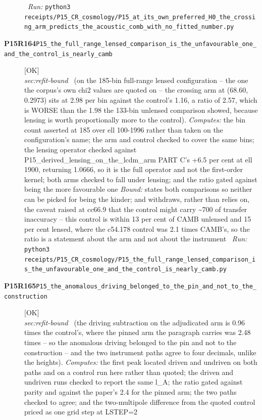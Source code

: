 \begin{description}
\ \emph{Run:} \texttt{python3 receipts/P15\_CR\_cosmology/P15\_at\_its\_own\_preferred\_H0\_the\_crossing\_arm\_predicts\_the\_acoustic\_comb\_with\_no\_fitted\_number.py}
\item[\rcptlabel{P15_the_full_range_lensed_comparison_is_the_unfavourable_one_and_the_control_is_nearly_camb}{P15R164}\textbf{P15R164}\quad\texttt{P15\_the\_full\_range\_lensed\_comparison\_is\_the\_unfavourable\_one\_and\_the\_control\_is\_nearly\_camb}]\hfill\textsf{[OK]}\\
\textit{sec:refit-bound} \ (on the 185-bin full-range lensed configuration -- the one the corpus's own chi2 values are quoted on -- the crossing arm at (68.60, 0.2973) sits at 2.98 per bin against the control's 1.16, a ratio of 2.57, which is WORSE than the 1.98 the 133-bin unlensed comparison showed, because lensing is worth proportionally more to the control). 
\emph{Computes:} the bin count asserted at 185 over ell 100-1996 rather than taken on the configuration's name; the arm and control checked to cover the same bins; the lensing operator checked against P15\_derived\_lensing\_on\_the\_lcdm\_arm PART C's +6.5 per cent at ell 1900, returning 1.0666, so it is the full operator and not the first-order kernel; both arms checked to fall under lensing; and the ratio gated against being the more favourable one
 \emph{Bound:} states both comparisons so neither can be picked for being the kinder; and withdraws, rather than relies on, the caveat raised at cc66.9 that the control might carry \textasciitilde{}700 of transfer inaccuracy -- this control is within 13 per cent of CAMB unlensed and 15 per cent lensed, where the c54.178 control was 2.1 times CAMB's, so the ratio is a statement about the arm and not about the instrument
\ \emph{Run:} \texttt{python3 receipts/P15\_CR\_cosmology/P15\_the\_full\_range\_lensed\_comparison\_is\_the\_unfavourable\_one\_and\_the\_control\_is\_nearly\_camb.py}
\item[\rcptlabel{P15_the_anomalous_driving_belonged_to_the_pin_and_not_to_the_construction}{P15R165}\textbf{P15R165}\quad\texttt{P15\_the\_anomalous\_driving\_belonged\_to\_the\_pin\_and\_not\_to\_the\_construction}]\hfill\textsf{[OK]}\\
\textit{sec:refit-bound} \ (the driving subtraction on the adjudicated arm is 0.96 times the control's, where the pinned arm the paragraph carries was 2.48 times -- so the anomalous driving belonged to the pin and not to the construction -- and the two instrument paths agree to four decimals, unlike the heights). 
\emph{Computes:} the first peak located driven and undriven on both paths and on a control run here rather than quoted; the driven and undriven runs checked to report the same l\_A; the ratio gated against parity and against the paper's 2.4 for the pinned arm; the two paths checked to agree; and the two-multipole difference from the quoted control priced as one grid step at LSTEP=2

\end{description}

